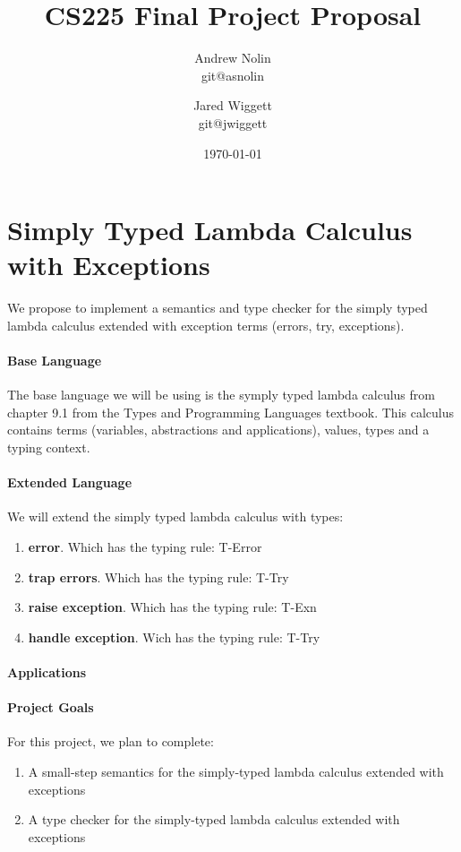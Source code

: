 \documentclass{article}
\title{CS225 Final Project Proposal}
\author{Andrew Nolin \\ git@asnolin \and Jared Wiggett \\ git@jwiggett}
\date{\today}
\begin{document}
\maketitle
\section*{Simply Typed Lambda Calculus with Exceptions}
We propose to implement a semantics and type checker for the simply typed lambda calculus extended with exception terms (errors, try, exceptions). 


\paragraph{Base Language}
The base language we will be using is the symply typed lambda calculus from chapter 9.1 from the Types and Programming Languages textbook. This calculus contains terms (variables, abstractions and  applications), values, types and a typing context.
\paragraph{Extended Language}
We will extend the simply typed lambda calculus with types: 
\begin{enumerate}
	\item \textbf{error}. Which has the typing rule: T-Error
	\item \textbf{trap errors}. Which has the typing rule: T-Try
	\item \textbf{raise exception}. Which has the typing rule: T-Exn
	\item \textbf{handle exception}. Wich has the typing rule: T-Try
\end{enumerate}
\paragraph{Applications}

\paragraph{Project Goals}
For this project, we plan to complete:
\begin{enumerate}
\item A small-step semantics for the simply-typed lambda calculus extended with exceptions
\item A type checker for the simply-typed lambda calculus extended with exceptions
\end{enumerate}
\end{document}
